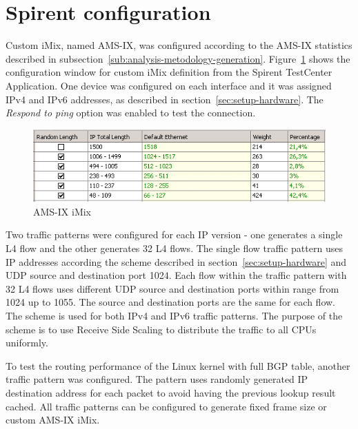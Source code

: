 
\section{Spirent configuration}\label{sec:setup-spirent}
Custom iMix, named AMS-IX, was configured according to the AMS-IX statistics described in
subsection~\ref{sub:analysis-metodology-generation}.
Figure~\ref{fig:setup-amsix-imix} shows the configuration window for custom iMix definition
from the Spirent TestCenter Application.
One device was configured on each interface and it was assigned IPv4 and IPv6 addresses, as described in section~\ref{sec:setup-hardware}.
The {\it{Respond to ping}} option was enabled to test the connection.

\begin{figure}
	\centering
	\includegraphics[width=14.5cm,keepaspectratio]{fig/amsix-imix.png}
	\caption{AMS-IX iMix}
	\label{fig:setup-amsix-imix}
\end{figure}

Two traffic patterns were configured for each IP version - one generates a single L4 flow and the other
generates 32 L4 flows.
The single flow traffic pattern uses IP addresses according the scheme described in section~\ref{sec:setup-hardware}
and UDP source and destination port 1024.
Each flow within the traffic pattern with 32 L4 flows uses different UDP source and destination ports
within range from 1024 up to 1055.
The source and destination ports are the same for each flow.
The scheme is used for both IPv4 and IPv6 traffic patterns.
The purpose of the scheme is to use Receive Side Scaling to distribute the traffic to all CPUs uniformly.

To test the routing performance of the Linux kernel with full BGP table, 
another traffic pattern was configured.
The pattern uses randomly generated IP destination address for each packet
to avoid having the previous lookup result cached.
All traffic patterns can be configured to generate fixed frame size or custom AMS-IX iMix.
